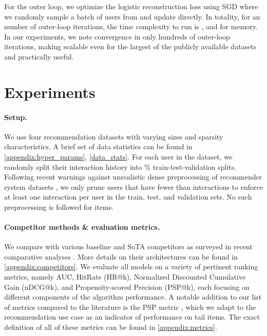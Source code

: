 \documentclass{article}
\begin{document}
For the outer loop, we optimize the logistic reconstruction loss using SGD where we randomly sample a batch of  users from  and update  directly. In totality, for an  number of outer-loop iterations, the time complexity to run \sampler is , and  for memory. In our experiments, we note convergence in only hundreds of outer-loop iterations, making \sampler scalable even for the largest of the publicly available datasets and practically useful.

\section{Experiments} \label{sec:experiments}

\paragraph{Setup.} We use four recommendation datasets with varying sizes and sparsity characteristics. A brief set of data statistics can be found in \cref{appendix:hyper_params}, \cref{data_stats}. 
For each user in the dataset, we randomly split their interaction history into \% train-test-validation splits. Following recent warnings against unrealistic dense preprocessing of recommender system datasets \cite{sigir20, wsdm22}, we only prune users that have fewer than  interactions to enforce at least one interaction per user in the train, test, and validation sets. No such preprocessing is followed for items. 


\paragraph{Competitor methods \& evaluation metrics.} We compare \model with various baseline and SoTA competitors as surveyed in recent comparative analyses \cite{recsys_sota_quest, making_progress}. More details on their architectures can be found in \cref{appendix:competitors}. We evaluate all models on a variety of pertinent ranking metrics, namely AUC, HitRate (HR@k), Normalized Discounted Cumulative Gain (nDCG@k), and Propensity-scored Precision (PSP@k), each focusing on different components of the algorithm performance. A notable addition to our list of metrics compared to the literature is the PSP metric \cite{pfastre}, which we adapt to the recommendation use case as an indicator of performance on tail items. The exact definition of all of these metrics can be found in \cref{appendix:metrics}.
\end{document}
